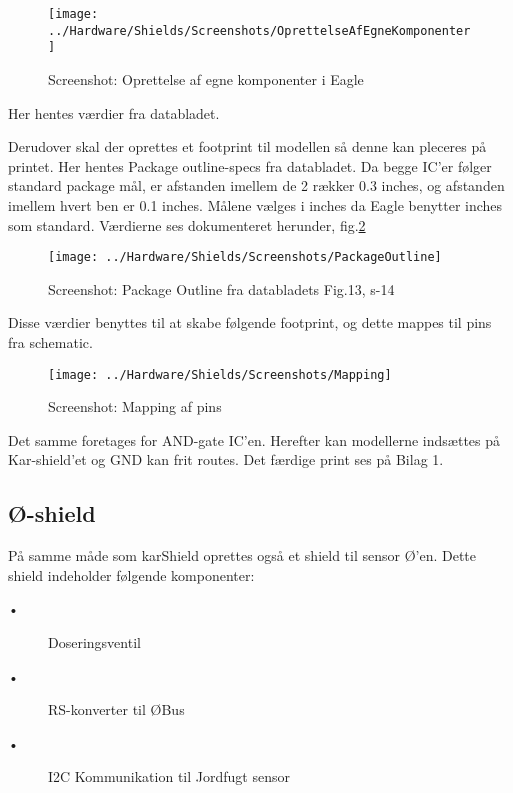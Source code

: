 \begin{figure}[H]
	\centering
	\texttt{[image: ../Hardware/Shields/Screenshots/OprettelseAfEgneKomponenter]}
	\caption{Screenshot: Oprettelse af egne komponenter i Eagle}
	\label{screenshot:EagleComponents}
\end{figure}

Her hentes værdier fra databladet.

Derudover skal der oprettes et footprint til modellen så denne kan pleceres på printet. Her hentes Package outline-specs fra databladet. Da begge IC'er følger standard package mål, er afstanden imellem de 2 rækker 0.3 inches, og afstanden imellem hvert ben er 0.1 inches. 
Målene vælges i inches da Eagle benytter inches som standard. Værdierne ses dokumenteret herunder, fig.\ref{screenshot:PackageOutline} 

\begin{figure}[H]
	\centering
	\texttt{[image: ../Hardware/Shields/Screenshots/PackageOutline]}
	\caption{Screenshot: Package Outline fra databladets Fig.13, s-14 }
	\label{screenshot:PackageOutline}
\end{figure}

	
Disse værdier benyttes til at skabe følgende footprint, og dette mappes til pins fra schematic. 

\begin{figure}[H]
	\centering
	\texttt{[image: ../Hardware/Shields/Screenshots/Mapping]}
	\caption{Screenshot: Mapping af pins}
	\label{screenshot:Mapping}
\end{figure}
	
Det samme foretages for AND-gate IC'en. 
Herefter kan modellerne indsættes på Kar-shield'et og GND kan frit routes. Det færdige print ses på Bilag 1.

\subsection{Ø-shield}

På samme måde som karShield oprettes også et shield til sensor Ø'en. Dette shield indeholder følgende komponenter: 

\begin{description}
 \item[•] Doseringsventil
 \item[•] RS-konverter til ØBus
 \item[•] I2C Kommunikation til Jordfugt sensor
\end{description}

